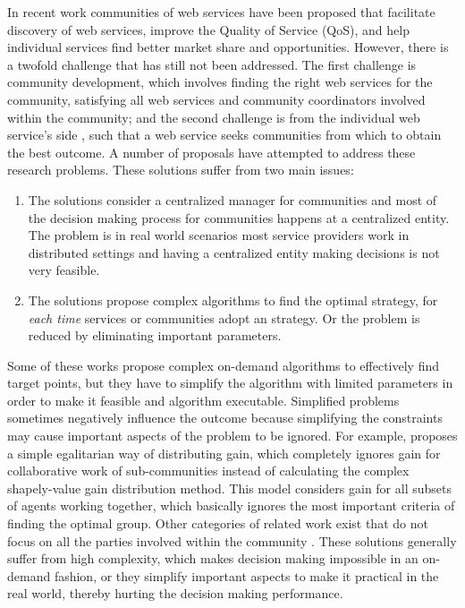 \documentclass[10pt,journal,cspaper,compsoc]{IEEEtran}
\begin{document}
In recent work communities of web services have been proposed that facilitate discovery of web services, improve the Quality of Service (QoS), and help individual services find better market share and opportunities. However, there is a twofold challenge that has still not been addressed. The first challenge is community development, which involves finding the right web services for the community, satisfying all web services and community coordinators involved within the community; and the second challenge is from the individual web service's side , such that a web service seeks communities from which to obtain the best outcome. A number of proposals have attempted to address these research problems. These solutions suffer from two main issues: 
\begin{enumerate}
	\item The solutions consider a centralized manager for communities and most of the decision making process for communities happens at a centralized entity. The problem is in real world scenarios most service providers work in distributed settings and having a centralized entity making decisions is not very feasible. 
	\item The solutions propose complex algorithms \cite{DBLP:conf/IEEEscc/LimTMB12, 10.1109/TSC.2012.12, 10.1109/TSC.2014.2312940} to find the optimal strategy, for \emph{each time} services or communities adopt an strategy. Or the problem is reduced by eliminating important parameters.
\end{enumerate}
Some of these works propose complex on-demand algorithms \cite{DBLP:conf/IEEEscc/LimTMB12, 10.1109/TSC.2012.12, 10.1109/TSC.2014.2312940} to effectively find target points, but they have to simplify the algorithm with limited parameters in order to make it feasible and algorithm executable. Simplified problems sometimes negatively influence the outcome because simplifying the constraints may cause important aspects of the problem to be ignored. For example, \cite{10.1109/TSC.2012.12} proposes a simple egalitarian way of distributing gain, which completely ignores gain for collaborative work of sub-communities instead of calculating the complex shapely-value gain distribution method. This model considers gain for all subsets of agents working together, which basically ignores the most important criteria of finding the optimal group. Other categories of related work exist that do not focus on all the parties involved within the community \cite{DBLP:conf/IEEEscc/KhosravifarABT11}. 
These solutions generally suffer from high complexity, which makes decision making impossible in an on-demand fashion, or they simplify important aspects to make it practical in the real world, thereby hurting the decision making performance. 
\end{document}

